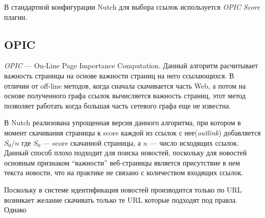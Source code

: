 В стандартной конфигурации Nutch для выбора ссылок используется \textit{OPIC Score} плагин.
\subsection{OPIC}
\textit{OPIC} --- On-Line Page Importance Computation\cite{opic}. Данный алгоритм расчитывает важность страницы на основе важности страниц на него ссылающихся. В отличии от off-line методов, когда сначала скачивается часть Web, а потом на основе полученного графа ссылок вычисляется важность страниц, этот метод позволяет работать когда большая часть сетевого графа еще не известна.

В Nutch реализована упрощенная версия данного алгоритма, при котором в момент скачивания страницы к score каждой из ссылок с нее(\textit{outlink}) добавляется $S_{0}/n$ где $S_{0}$ --- score скачанной страницы, а $n$ --- число исходящих ссылок. Данный способ плохо подходит для поиска новостей, поскольку для новостей основным признаком ``важности'' веб-страницы является присутствие в нем текста новости, что на практике не связано с количеством входящих ссылок.

Поскольку в системе идентификация новостей производится только по URL возникает желание скачивать только те URL которые подходят под правла. Однако 
